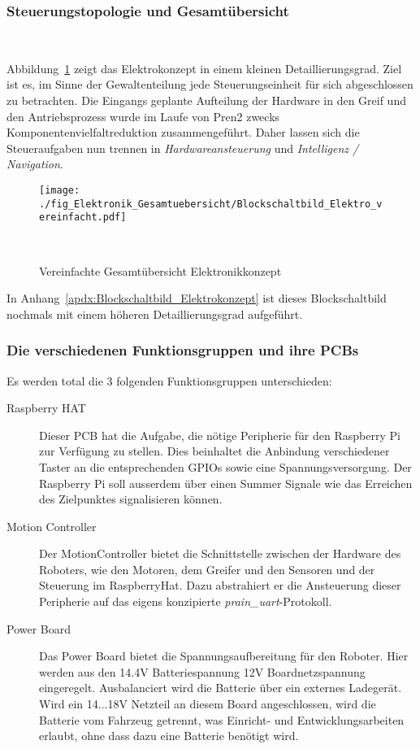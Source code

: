 \documentclass[main.tex]{subfiles} %
\begin{document}

\subsubsection{Steuerungstopologie und Gesamtübersicht}~\label{sec:Gesamtuebersicht_Elektro}

Abbildung~\ref{fig:Gesamtuebersicht_vereinfacht} zeigt das Elektrokonzept in
einem kleinen Detaillierungsgrad. Ziel ist es, im Sinne der Gewaltenteilung
jede Steuerungseinheit für sich abgeschlossen zu betrachten. Die Eingangs
geplante Aufteilung der Hardware in den Greif und den Antriebsprozess wurde im
Laufe von Pren2 zwecks Komponentenvielfaltreduktion zusammengeführt. Daher
lassen sich die Steueraufgaben nun trennen in \textit{Hardwareansteuerung} und
\textit{Intelligenz / Navigation}.

\begin{figure}[H]
    \centering
    \texttt{[image: ./fig\_Elektronik\_Gesamtuebersicht/Blockschaltbild\_Elektro\_vereinfacht.pdf]}
    \caption{Vereinfachte Gesamtübersicht Elektronikkonzept}~\label{fig:Gesamtuebersicht_vereinfacht}
\end{figure}

In Anhang~\ref{apdx:Blockschaltbild_Elektrokonzept} ist dieses Blockschaltbild
nochmals mit einem höheren Detaillierungsgrad aufgeführt.

\subsubsection*{Die verschiedenen Funktionsgruppen und ihre PCBs}
Es werden total die 3 folgenden Funktionsgruppen unterschieden:

\begin{description}
    \item[Raspberry HAT] Dieser PCB hat die Aufgabe, die nötige Peripherie für den
        Raspberry Pi zur Verfügung zu stellen. Dies beinhaltet die Anbindung
        verschiedener Taster an die entsprechenden GPIOs sowie eine
        Spannungsversorgung. Der Raspberry Pi soll ausserdem über einen Summer Signale
        wie das Erreichen des Zielpunktes signalisieren können.
    \item[Motion Controller] Der MotionController bietet die Schnittstelle zwischen der
        Hardware des Roboters, wie den Motoren, dem Greifer und den Sensoren und der
        Steuerung im RaspberryHat. Dazu abstrahiert er die Ansteuerung dieser
        Peripherie auf das eigens konzipierte \textit{prain\_uart}-Protokoll.
    \item[Power Board] Das Power Board bietet die Spannungsaufbereitung für den Roboter.
        Hier werden aus den 14.4V Batteriespannung 12V Boardnetzspannung eingeregelt.
        Ausbalanciert wird die Batterie über ein externes Ladegerät. Wird ein 14...18V
        Netzteil an diesem Board angeschlossen, wird die Batterie vom Fahrzeug
        getrennt, was Einricht- und Entwicklungsarbeiten erlaubt, ohne dass dazu eine
        Batterie benötigt wird.
\end{description}
\end{document}
